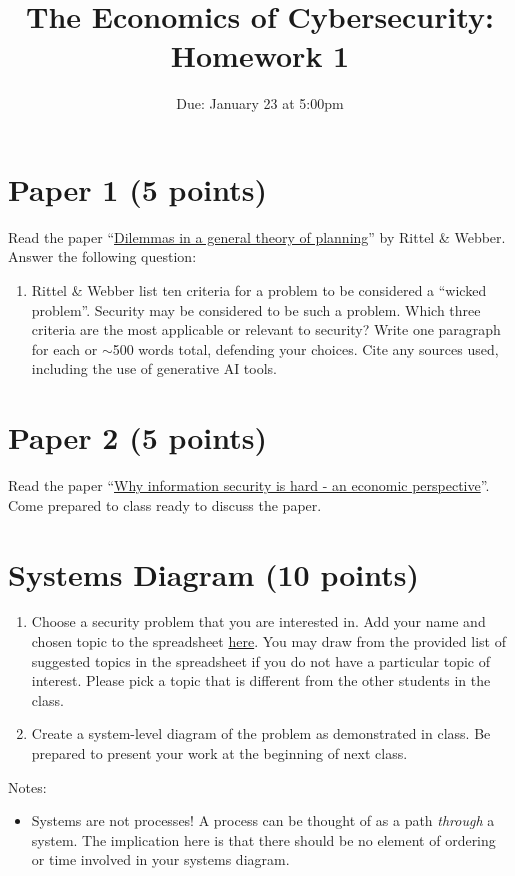 \documentclass[11pt]{article}
\title{The Economics of Cybersecurity: Homework 1}
\date{Due: January 23 at 5:00pm}
\author{}
\begin{document}
\maketitle

\section{Paper 1 (5 points)}

Read the paper ``\href{https://link.springer.com/article/10.1007/bf01405730}{Dilemmas in a general theory of planning}'' by Rittel \& Webber. Answer the following question:

\begin{enumerate}
    \item Rittel \& Webber list ten criteria for a problem to be considered a ``wicked problem''. Security may be considered to be such a problem. Which three criteria are the most applicable or relevant to security? Write one paragraph for each or $\sim$500 words total, defending your choices. Cite any sources used, including the use of generative AI tools.  

\end{enumerate}

\section{Paper 2 (5 points)}

Read the paper ``\href{https://ieeexplore.ieee.org/abstract/document/991552}{Why information security is hard - an economic perspective}''. Come prepared to class ready to discuss the paper.


\section{Systems Diagram (10 points)}

\begin{enumerate}
    \item Choose a security problem that you are interested in. Add your name and chosen topic to the spreadsheet \href{https://docs.google.com/spreadsheets/d/1SdaMpeCo4CE8o0U_irGhWmVXJYHybRWoiX4uwZYMhCE/edit#gid=0}{here}. You may draw from the provided list of suggested topics in the spreadsheet if you do not have a particular topic of interest. Please pick a topic that is different from the other students in the class.
    \item Create a system-level diagram of the problem as demonstrated in class. Be prepared to present your work at the beginning of next class.
\end{enumerate}

Notes:
\begin{itemize}
    \item Systems are not processes! A process can be thought of as a path {\it through} a system. The implication here is that there should be no element of ordering or time involved in your systems diagram.
\end{itemize}
\end{document}
